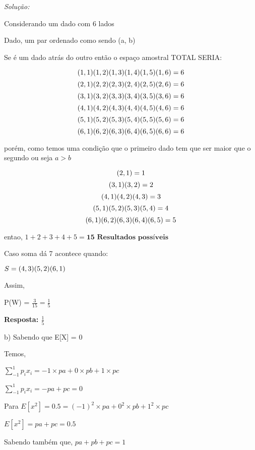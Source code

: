 \documentclass{article}
\newenvironment{solution}
    {\textit{Solução:}}
    {}
\begin{document}
\begin{solution}

Considerando um dado com 6 lados

Dado, um par ordenado como sendo (a, b)

Se é um dado atrás do outro então o espaço amostral TOTAL SERIA:

\[ (1,1) (1,2) (1,3) (1,4) (1,5) (1,6) = 6 \newline \]
\[ (2,1) (2,2) (2,3) (2,4) (2,5) (2,6) = 6 \newline \]
\[ (3,1) (3,2) (3,3) (3,4) (3,5) (3,6) = 6 \newline \]
\[ (4,1) (4,2) (4,3) (4,4) (4,5) (4,6) = 6\newline \]
\[ (5,1) (5,2) (5,3) (5,4) (5,5) (5,6) = 6\newline \]
\[ (6,1) (6,2) (6,3) (6,4) (6,5) (6,6) = 6\newline \]

porém, como temos uma condição que o primeiro dado tem que ser maior que o segundo ou seja $a>b$


\[ (2,1) = 1 \newline \]
\[ (3,1) (3,2) = 2 \newline \]
\[ (4,1) (4,2) (4,3) = 3\newline \]
\[ (5,1) (5,2) (5,3) (5,4) = 4\newline \]
\[ (6,1) (6,2) (6,3) (6,4) (6,5) = 5\newline \]

entao, $1 + 2 + 3 + 4 + 5 = \textbf{15 Resultados possíveis}$

Caso soma dá 7 acontece quando:

$S = {(4,3) (5,2) (6,1)}\newline$ 

Assim, 

P(W) = $\frac{3}{15} = \frac{1}{5}$


\textbf{Resposta: $\frac{1}{5}$}

\hrulefill

b) Sabendo que E[X] = 0

Temos,

$\sum_{-1}^{1} p_{i} x_{i} = -1 \times pa + 0 \times pb + 1 \times pc$

$\sum_{-1}^{1} p_{i} x_{i} = -pa + pc = 0$

Para $E[x^{2}] = 0.5 = (-1)^{2} \times pa + 0^{2} \times pb + 1^{2} \times pc$

$E[x^{2}] = pa + pc = 0.5$

Sabendo também que, $pa+pb+pc = 1$


\end{solution}
\end{document}
